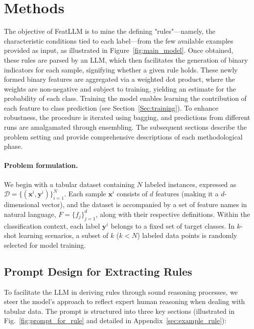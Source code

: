 \section{Methods}
The objective of \textsf{FeatLLM} is to mine the defining "rules"—namely, the characteristic conditions tied to each label—from the few available examples provided as input, as illustrated in Figure~\ref{fig:main_model}. Once obtained, these rules are parsed by an LLM, which then facilitates the generation of binary indicators for each sample, signifying whether a given rule holds. These newly formed binary features are aggregated via a weighted dot product, where the weights are non-negative and subject to training, yielding an estimate for the probability of each class. Training the model enables learning the contribution of each feature to class prediction (see Section~\ref{Sec:training}). To enhance robustness, the procedure is iterated using bagging, and predictions from different runs are amalgamated through ensembling. The subsequent sections describe the problem setting and provide comprehensive descriptions of each methodological phase.

\vspace*{-0.12in}
\paragraph{Problem formulation.} We begin with a tabular dataset containing $N$ labeled instances, expressed as $\mathcal{D} = \{(\mathbf{x}^i, \mathbf{y}^i)\}_{i=1}^{N}$. Each sample $\mathbf{x}^i$ consists of $d$ features (making it a $d$-dimensional vector), and the dataset is accompanied by a set of feature names in natural language, $F = \{f_j\}_{j=1}^{d}$, along with their respective definitions. Within the classification context, each label $\mathbf{y}^i$ belongs to a fixed set of target classes. In $k$-shot learning scenarios, a subset of $k$ ($k < N$) labeled data points is randomly selected for model training.

\subsection{Prompt Design for Extracting Rules}
\label{Sec:prompt_design}
To facilitate the LLM in deriving rules through sound reasoning processes, we steer the model's approach to reflect expert human reasoning when dealing with tabular data. The prompt is structured into three key sections (illustrated in Fig.~\ref{fig:prompt_for_rule} and detailed in Appendix~\ref{sec:example_rule}):

